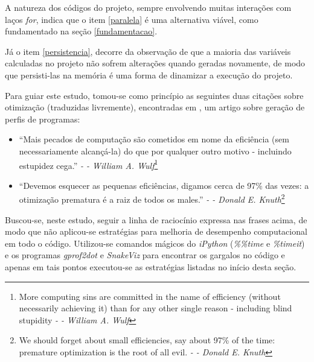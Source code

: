 \documentclass[12pt]{article}
\newcommand{\aspas}[1]{``#1''} %
\begin{document}
A natureza dos códigos do projeto, sempre envolvendo muitas interações com laços \textit{for}, indica que o item \ref{paralela} é uma alternativa viável, como fundamentado na seção \ref{fundamentacao}.

Já o item \ref{persistencia}, decorre da observação de que a maioria das variáveis calculadas no projeto não sofrem alterações quando geradas novamente, de modo que persisti-las na memória é uma forma de dinamizar a execução do projeto.

Para guiar este estudo, tomou-se como princípio as seguintes duas citações sobre otimização (traduzidas livremente), encontradas em \cite{hegde:2004}, um artigo sobre geração de perfis de programas:

\begin{itemize}
	\item \aspas{Mais pecados de computação são cometidos em nome da eficiência (sem necessariamente alcançá-la) do que por qualquer outro motivo - incluindo estupidez cega.} \textit{- -  William A. Wulf}\footnote{More computing sins are committed in the name of efficiency (without necessarily achieving it) than for any other single reason - including blind stupidity \textit{- -  William A. Wulf}}
	\item \aspas{Devemos esquecer as pequenas eficiências, digamos cerca de 97\% das vezes: a otimização prematura é a raiz de todos os males.} \textit{- -  Donald E. Knuth}\footnote{We should forget about small efficiencies, say about 97\% of the time: premature optimization is the root of all evil. \textit{- -  Donald E. Knuth}}
\end{itemize}

Buscou-se, neste estudo, seguir a linha de raciocínio expressa nas frases acima, de modo que não aplicou-se estratégias para melhoria de desempenho computacional em todo o código. Utilizou-se comandos mágicos do \textit{iPython} (\textit{\%\%time} e \textit{\%timeit}) e os programas \textit{gprof2dot} e \textit{SnakeViz} para encontrar os gargalos no código e apenas em tais pontos executou-se as estratégias listadas no início desta seção.


\end{document}
